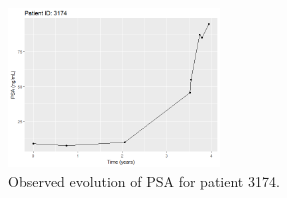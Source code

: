 \begin{figure}[!htb]
    \centering
    \captionsetup{justification=centering}
    \includegraphics[width=0.5\textwidth]{images/observed_psa_3174.png}
    \caption{Observed evolution of PSA for patient 3174.}
    \label{fig : observed_psa_3174}
\end{figure}